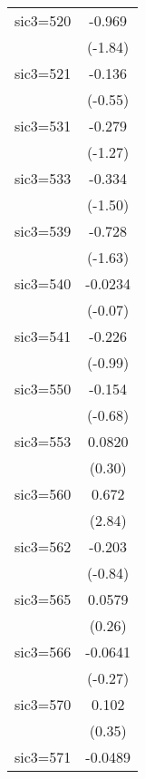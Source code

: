 \begin{table}[htbp]
\begin{tabular*}{0.8\hsize}{@{\hskip\tabcolsep\extracolsep\fill}l*{1}{c}}
\addlinespace
sic3=520            &      -0.969         \\
                    &     (-1.84)         \\
\addlinespace
sic3=521            &      -0.136         \\
                    &     (-0.55)         \\
\addlinespace
sic3=531            &      -0.279         \\
                    &     (-1.27)         \\
\addlinespace
sic3=533            &      -0.334         \\
                    &     (-1.50)         \\
\addlinespace
sic3=539            &      -0.728         \\
                    &     (-1.63)         \\
\addlinespace
sic3=540            &     -0.0234         \\
                    &     (-0.07)         \\
\addlinespace
sic3=541            &      -0.226         \\
                    &     (-0.99)         \\
\addlinespace
sic3=550            &      -0.154         \\
                    &     (-0.68)         \\
\addlinespace
sic3=553            &      0.0820         \\
                    &      (0.30)         \\
\addlinespace
sic3=560            &       0.672\sym{**} \\
                    &      (2.84)         \\
\addlinespace
sic3=562            &      -0.203         \\
                    &     (-0.84)         \\
\addlinespace
sic3=565            &      0.0579         \\
                    &      (0.26)         \\
\addlinespace
sic3=566            &     -0.0641         \\
                    &     (-0.27)         \\
\addlinespace
sic3=570            &       0.102         \\
                    &      (0.35)         \\
\addlinespace
sic3=571            &     -0.0489         \\

\end{tabular*}
\end{table}
